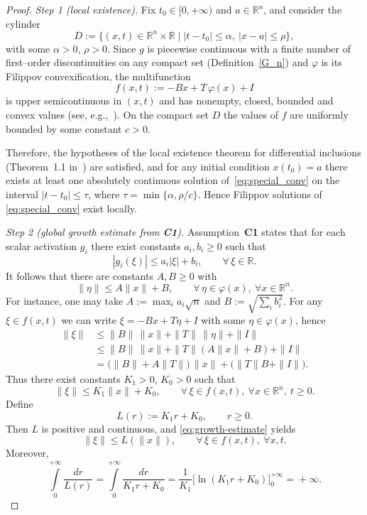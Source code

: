 \documentclass[journal]{IEEEtran}
\theoremstyle{myplain}
\begin{document}
\begin{proof}
\emph{Step 1 (local existence).}
Fix $t_0\in[0,+\infty)$ and $a\in\mathbb{R}^n$, and consider the
cylinder
\[
    D := \{(x,t)\in\mathbb{R}^n\times\mathbb{R} \mid
           |t-t_0|\le\alpha,\ |x-a|\le\rho\},
\]
with some $\alpha>0$, $\rho>0$.
Since $g$ is piecewise continuous with a finite number of first–order
discontinuities on any compact set (Definition~\ref{G_n}) and $\varphi$ is its
Filippov convexification, the multifunction
\[
   f(x,t) := -B x + T\,\varphi(x) + I
\]
is upper semicontinuous in $(x,t)$ and has nonempty, closed, bounded
and convex values (see, e.g.,~\cite[Ch.~1]{YLG}).
On the compact set $D$ the values of $f$ are uniformly bounded by some
constant $c>0$.

Therefore, the hypotheses of the local existence theorem for
differential inclusions (Theorem~1.1 in~\cite[Ch.~1]{YLG}) are
satisfied, and for any initial condition $x(t_0)=a$ there exists at
least one absolutely continuous solution of~\eqref{eq:special_conv} on
the interval $|t-t_0|\le\tau$, where
$\tau = \min\{\alpha,\rho/c\}$. Hence Filippov solutions of
\eqref{eq:special_conv} exist locally.

\emph{Step 2 (global growth estimate from \textbf{C1}).}
Assumption~\textbf{C1} states that for each scalar activation $g_i$ there exist
constants $a_i,b_i\ge0$ such that
\[
   |g_i(\xi)| \le a_i|\xi| + b_i, \qquad \forall\,\xi\in\mathbb{R}.
\]
It follows that there are constants $A,B\ge0$ with
\[
   \|\eta\| \le A\|x\| + B,
   \qquad \forall\,\eta\in\varphi(x),\ \forall x\in\mathbb{R}^n.
\]
For instance, one may take
$A \!\!:=\!\! \max_i a_i \sqrt{n}$ and
$B \!\!:=\!\! \sqrt{\sum_i b_i^2}$.
For any $\xi\in f(x,t)$ we can write
$\xi = -B x + T\eta + I$ with some $\eta\in\varphi(x)$, hence
\[
\begin{aligned}
   \|\xi\|
   &\le \|B\|\,\|x\| + \|T\|\,\|\eta\| + \|I\| \\
   &\le \|B\|\,\|x\| + \|T\|(A\|x\|+B) + \|I\| \\
   &= \bigl(\|B\| + A\|T\|\bigr)\,\|x\|
      + \bigl(\|T\|B + \|I\|\bigr).
\end{aligned}
\]
Thus there exist constants $K_1>0$, $K_0>0$ such that
\begin{equation}
   \|\xi\| \le K_1 \|x\| + K_0,
   \qquad \forall\,\xi\in f(x,t),\ \forall x\in\mathbb{R}^n,\ t\ge0.
   \label{eq:growth-estimate}
\end{equation}
Define
\[
   L(r) := K_1 r + K_0, \qquad r\ge0.
\]
Then $L$ is positive and continuous, and
\eqref{eq:growth-estimate} yields
\[
   \|\xi\| \le L(\|x\|),
   \qquad \forall\,\xi\in f(x,t),\ \forall x,t.
\]
Moreover,
\[
   \int\limits_0^{+\infty} \!\!\!\! \frac{dr}{L(r)}
   = \int\limits_0^{+\infty}\!\!\!\!\!\! \frac{dr}{K_1 r + K_0}
   = \frac{1}{K_1} \bigl[\ln(K_1 r + K_0)\bigr]_{0}^{+\infty}
   \! = \! +\infty.
\]


\end{proof}
\end{document}
